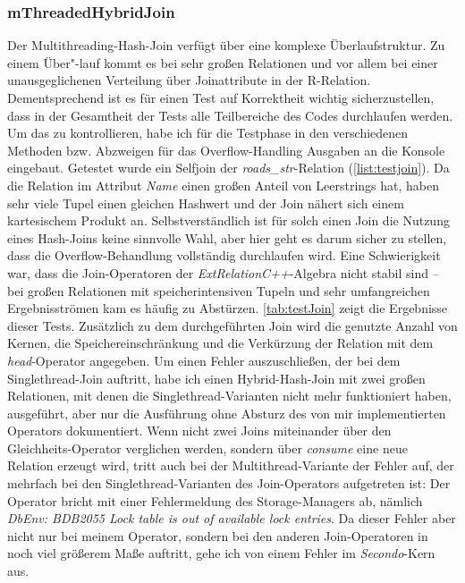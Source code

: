 \documentclass[a4paper,12pt,twoside]{article}
\newcommand{\Fb}[1]{\textit{#1}} %
\begin{document}
\subsubsection{mThreadedHybridJoin}

Der Multithreading-Hash-Join verfügt über eine komplexe Überlaufstruktur. Zu einem Über"-lauf kommt es bei sehr großen Relationen und vor allem bei einer unausgeglichenen Verteilung über Joinattribute in der R-Relation. Dementsprechend ist es für einen Test auf Korrektheit wichtig sicherzustellen, dass in der Gesamtheit der Tests alle Teilbereiche des Codes durchlaufen werden. Um das zu kontrollieren, habe ich für die Testphase in den verschiedenen Methoden bzw. Abzweigen für das Overflow-Handling Ausgaben an die Konsole eingebaut. Getestet wurde ein Selfjoin der \Fb{roads\_str}-Relation (\autoref{list:testjoin}). Da die Relation im Attribut \Fb{Name} einen großen Anteil von Leerstrings hat, haben sehr viele Tupel einen gleichen Hashwert und der Join nähert sich einem kartesischem Produkt an. Selbstverständlich ist für solch einen Join die Nutzung eines Hash-Joins keine sinnvolle Wahl, aber hier geht es darum sicher zu stellen, dass die Overflow-Behandlung vollständig durchlaufen wird. Eine Schwierigkeit war, dass die Join-Operatoren der \Fb{ExtRelationC++}-Algebra nicht stabil sind -- bei großen Relationen mit speicherintensiven Tupeln und sehr umfangreichen Ergebnisströmen kam es häufig zu Abstürzen. \autoref{tab:testJoin} zeigt die Ergebnisse dieser Tests. Zusätzlich zu dem durchgeführten Join wird die genutzte Anzahl von Kernen, die Speichereinschränkung und die Verkürzung der Relation mit dem \Fb{head}-Operator angegeben. Um einen Fehler auszuschließen, der bei dem Singlethread-Join auftritt, habe ich einen Hybrid-Hash-Join mit zwei großen Relationen, mit denen die Singlethread-Varianten nicht mehr funktioniert haben, ausgeführt, aber nur die Ausführung ohne Absturz des von mir implementierten Operators dokumentiert. Wenn nicht zwei Joins miteinander über den Gleichheits-Operator verglichen werden, sondern über \Fb{consume} eine neue Relation erzeugt wird, tritt auch bei der Multithread-Variante der Fehler auf, der mehrfach bei den Singlethread-Varianten des Join-Operators aufgetreten ist: Der Operator bricht mit einer Fehlermeldung des Storage-Managers ab, nämlich \Fb{DbEnv: BDB2055 Lock table is out of available lock entries}. Da dieser Fehler aber nicht nur bei meinem Operator, sondern bei den anderen Join-Operatoren in noch viel größerem Maße auftritt, gehe ich von einem Fehler im \Fb{Secondo}-Kern aus.
\end{document}
